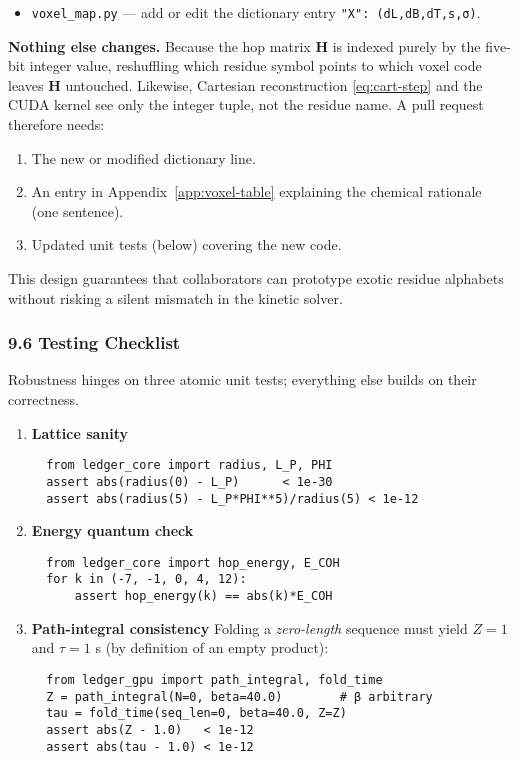 \documentclass[11pt]{article}
\begin{document}
\begin{itemize}\setlength\itemsep{2pt}
\item \texttt{voxel\_map.py} — add or edit the dictionary entry
      \texttt{"X": (dL,dB,dT,s,σ)}.
\end{itemize}

\noindent\textbf{Nothing else changes.}  
Because the hop matrix \(\mathbf H\) is indexed purely by the five-bit
integer value, reshuffling which residue symbol points to which voxel
code leaves \(\mathbf H\) untouched.  Likewise, Cartesian reconstruction
\eqref{eq:cart-step} and the CUDA kernel see only the integer tuple, not
the residue name.  A pull request therefore needs:

\begin{enumerate}\setlength\itemsep{2pt}
\item The new or modified dictionary line.
\item An entry in Appendix~\ref{app:voxel-table} explaining the chemical
      rationale (one sentence).
\item Updated unit tests (below) covering the new code.
\end{enumerate}

This design guarantees that collaborators can prototype exotic residue
alphabets without risking a silent mismatch in the kinetic solver.

\bigskip
\subsubsection*{9.6  Testing Checklist}\label{sec:impl-tests}

Robustness hinges on three atomic unit tests; everything else builds on
their correctness.

\begin{enumerate}\setlength\itemsep{4pt}
\item \textbf{Lattice sanity}  
  \begin{verbatim}
  from ledger_core import radius, L_P, PHI
  assert abs(radius(0) - L_P)      < 1e-30
  assert abs(radius(5) - L_P*PHI**5)/radius(5) < 1e-12
  \end{verbatim}

\item \textbf{Energy quantum check}  
  \begin{verbatim}
  from ledger_core import hop_energy, E_COH
  for k in (-7, -1, 0, 4, 12):
      assert hop_energy(k) == abs(k)*E_COH
  \end{verbatim}

\item \textbf{Path-integral consistency}  
  Folding a \emph{zero-length} sequence must yield $Z=1$ and
  $\tau=1$ s (by definition of an empty product):
  \begin{verbatim}
  from ledger_gpu import path_integral, fold_time
  Z = path_integral(N=0, beta=40.0)        # β arbitrary
  tau = fold_time(seq_len=0, beta=40.0, Z=Z)
  assert abs(Z - 1.0)   < 1e-12
  assert abs(tau - 1.0) < 1e-12
  \end{verbatim}
\end{enumerate}
\end{document}
